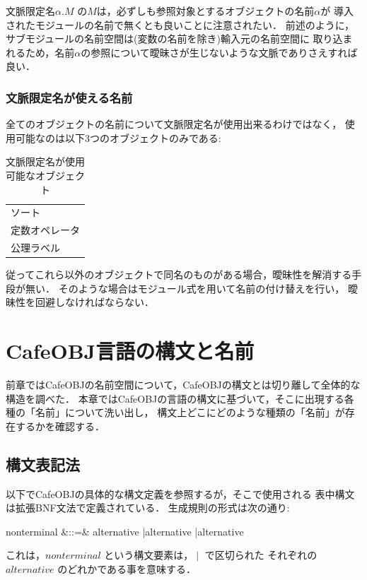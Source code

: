 \documentclass[a4paper,oneside,10pt]{memoir}
\def\alt{{\;|\;}}
\def\synindent{\;\;\;}
\newenvironment{vvtm}%
{\parskip=0pt\lineskip=0pt\begin{center}\begin{minipage}{0.8\textwidth}\begin{snugshade}}%
  {\end{snugshade}\end{minipage}\end{center}}
\begin{document}
文脈限定名$\alpha.M$ の$M$は，必ずしも参照対象とするオブジェクトの名前$\alpha$が%
導入されたモジュールの名前で無くとも良いことに注意されたい．
前述のように，サブモジュールの名前空間は(変数の名前を除き)輸入元の名前空間に
取り込まれるため，名前$\alpha$の参照について曖昧さが生じないような文脈でありさえすれば良い．

\subsubsection{文脈限定名が使える名前}
\label{sec:available-qualified-name}

全てのオブジェクトの名前について文脈限定名が使用出来るわけではなく，
使用可能なのは以下3つのオブジェクトのみである:
\begin{table}[htb]
\begin{vvtm}
\begin{center}
\begin{tabular}{l}
ソート \\
定数オペレータ \\
公理ラベル \\
\end{tabular}
\end{center}
\end{vvtm}
\caption{文脈限定名が使用可能なオブジェクト}
\label{tbl:qulifiable-names}
\end{table}

従ってこれら以外のオブジェクトで同名のものがある場合，曖昧性を解消する手段が無い．
そのような場合はモジュール式を用いて名前の付け替えを行い，
曖昧性を回避しなければならない．

\section{CafeOBJ言語の構文と名前}
\label{sec:cafeobj-syntax-and-names}
前章ではCafeOBJの名前空間について，CafeOBJの構文とは切り離して全体的な構造を調べた．
本章ではCafeOBJの言語の構文に基づいて，そこに出現する各種の「名前」について洗い出し，
構文上どこにどのような種類の「名前」が存在するかを確認する．

\subsection{構文表記法}
\label{sec:syntax-notation}
以下でCafeOBJの具体的な構文定義を参照するが，そこで使用される
表中構文は拡張BNF文法で定義されている．
生成規則の形式は次の通り:
\begin{syntax}
\synindent\synindent  nonterminal &::=& alternative \alt alternative \alt \cdots \alt alternative
\end{syntax}
これは，$nonterminal$ という構文要素は，$\alt$ で区切られた
それぞれの $alternative$ のどれかである事を意味する．
\end{document}
